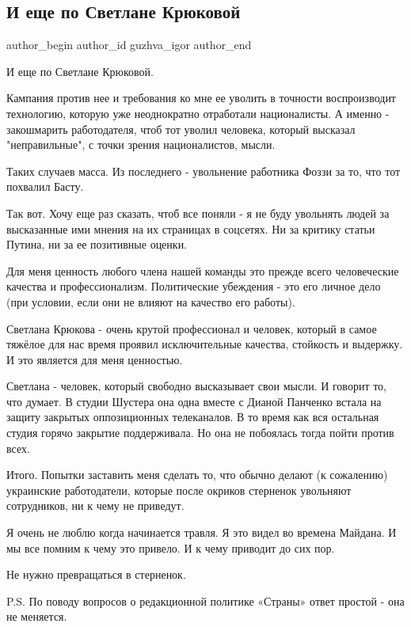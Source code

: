  
 
 
 
 
 
\subsection{И еще по Светлане Крюковой}
\label{sec:18_07_2021.fb.guzhva_igor.1.svetlana}
 
\ifcmt
 author_begin
   author_id guzhva_igor
 author_end
\fi

И еще по Светлане Крюковой.

Кампания против нее и требования ко мне ее уволить в точности воспроизводит
технологию, которую уже неоднократно отработали националисты. А именно -
закошмарить работодателя, чтоб тот уволил человека, который высказал
"неправильные", с точки зрения националистов, мысли.

Таких случаев масса. Из последнего - увольнение работника Фоззи за то, что тот
похвалил Басту.

Так вот. Хочу еще раз сказать, чтоб все поняли - я не буду увольнять людей за
высказанные ими мнения на их страницах в соцсетях. Ни за критику статьи Путина,
ни за ее позитивные оценки.

Для меня ценность любого члена нашей команды это прежде всего человеческие
качества и профессионализм. Политические убеждения - это его личное дело (при
условии, если они не влияют на качество его работы).  

Светлана Крюкова - очень крутой профессионал и человек, который в самое тяжёлое
для нас время проявил исключительные качества, стойкость и выдержку. И это
является для меня ценностью.

Светлана - человек, который свободно высказывает свои мысли. И говорит то, что
думает. В студии Шустера она одна вместе с Дианой Панченко встала на защиту
закрытых оппозиционных телеканалов. В то время как вся остальная студия горячо
закрытие поддерживала. Но она не побоялась тогда пойти против всех. 

Итого. Попытки заставить меня сделать то, что обычно делают (к сожалению)
украинские работодатели, которые после окриков стерненок увольняют сотрудников,
ни к чему не приведут. 

Я очень не люблю когда начинается травля. Я это видел во времена Майдана. И мы
все помним к чему это привело. И к чему приводит до сих пор.

Не нужно превращаться в стерненок.

P.S. По поводу вопросов о редакционной политике «Страны» ответ простой - она не
меняется.

